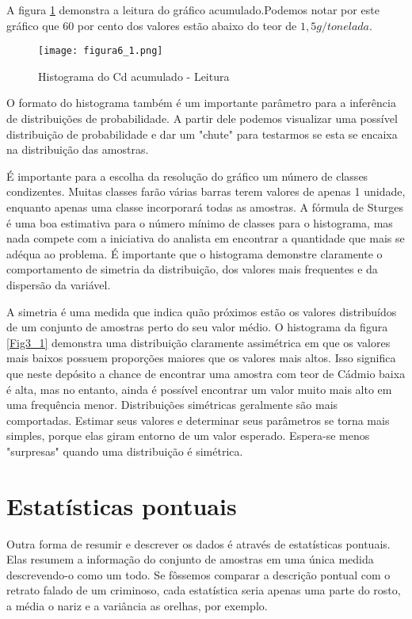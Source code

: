A figura \ref{Fig6_1} demonstra a leitura do gráfico acumulado.Podemos notar por este gráfico que 60 por cento dos valores estão abaixo do teor de $1,5 g/tonelada$.  

\begin{figure}[H]
	\texttt{[image: figura6\_1.png]}	
	\caption{Histograma do Cd acumulado - Leitura}
	\label{Fig6_1}
\end{figure}



O formato do histograma também é um importante parâmetro para a inferência de distribuições de probabilidade. A partir dele podemos visualizar uma possível distribuição de probabilidade e dar um "chute" para testarmos se esta se encaixa na distribuição das amostras. 

É importante para a escolha da resolução do gráfico um número de classes condizentes. Muitas classes farão várias barras terem valores de apenas 1 unidade, enquanto apenas uma classe incorporará todas as amostras. A fórmula de Sturges é uma boa estimativa para o número mínimo de classes para o histograma, mas nada compete com a iniciativa do analista em encontrar a quantidade que mais se adéqua ao problema. É importante que o histograma demonstre claramente o comportamento de simetria da distribuição, dos valores mais frequentes e da dispersão da variável.

 A simetria é uma medida que indica quão próximos estão os valores distribuídos de um conjunto de amostras perto do seu valor médio. O histograma da figura \ref{Fig3_1} demonstra uma distribuição claramente assimétrica em que os valores mais baixos possuem proporções maiores que os valores mais altos. Isso significa que neste depósito a chance de encontrar uma amostra com teor de Cádmio baixa é alta, mas no entanto, ainda é possível encontrar um valor muito mais alto em uma frequência menor. Distribuições simétricas geralmente são mais comportadas. Estimar seus valores e determinar seus parâmetros se torna mais simples, porque elas giram entorno de um valor esperado. Espera-se menos "surpresas" quando uma distribuição é simétrica. 


\section{Estatísticas pontuais}

Outra forma de resumir e descrever os dados é através de estatísticas pontuais. Elas resumem a informação do conjunto de amostras em uma única medida descrevendo-o como um todo. Se fôssemos comparar a descrição pontual com o retrato falado de um criminoso, cada estatística seria apenas uma parte do rosto, a média o nariz e a variância as orelhas, por exemplo. 

